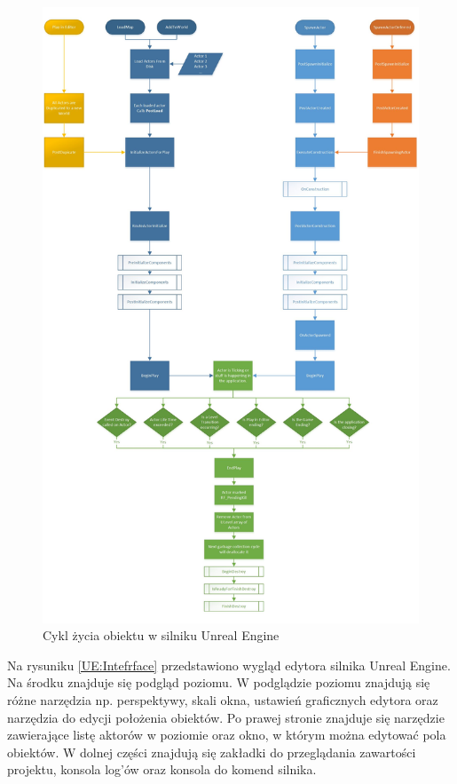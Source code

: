 \documentclass[12pt,twoside]{article}
\begin{document}
\begin{figure}[ht]
    \centering
    \includegraphics[width=14cm]{figures/ActorLifeCycle1UNREAL.jpg}
    \caption{Cykl życia obiektu w silniku Unreal Engine\cite{UE:ActorLifeCycleSource}}
    \label{UE:ActorLifeCycle}
\end{figure}
\clearpage
Na rysuniku \ref{UE:Intefrface} przedstawiono wygląd edytora silnika Unreal Engine.  Na
środku znajduje się podgląd poziomu. W podglądzie poziomu znajdują się różne
narzędzia np. perspektywy, skali okna, ustawień graficznych edytora oraz
narzędzia do edycji położenia obiektów. Po prawej stronie znajduje się narzędzie
zawierające listę aktorów w poziomie oraz okno, w którym można edytować pola
obiektów. W dolnej części znajdują się zakładki do przeglądania zawartości
projektu, konsola log’ów oraz konsola do komend silnika. 
\end{document}

